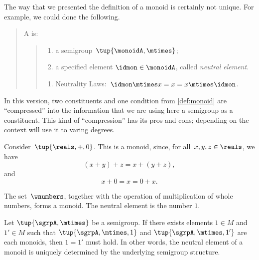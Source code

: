\begin{remark}
The way that we presented the definition of a monoid is certainly not unique. For example, we could done the following. 

\begin{quote}
  A \emph{} is: 
\begin{quote}
   \constit
   \begin{enumerate}
    \item a semigroup~$\tup{\monoidA, \mtimes}$;
    \item a specified element $\idmon\in \monoidA$, called \emph{neutral element}.
  \end{enumerate}
\condit
  \begin{enumerate}
    \item Neutrality Laws:~$\idmon\mtimes x=x=x\mtimes \idmon$.
  \end{enumerate}
  \end{quote}
\end{quote}
In this version, two constituents and one condition from \cref{def:monoid} are ``compressed'' into the information that we are using here a semigroup as a constituent. This kind of ``compression'' has its pros and cons; depending on the context will use it to varing degrees. 
\end{remark}




\begin{example}
  Consider~$\tup{\reals,+,0}$. This is a monoid, since, for all~$x,y, z \in \reals$, we have
  \begin{equation*}
  (x+y)
    +z=x+(y+z),
  \end{equation*}
  and
  \begin{equation*}
    x+0=x=0+x.
  \end{equation*}
\end{example}

\begin{example}
The set~$\wnumbers$, together with the operation of multiplication of whole numbers, forms a monoid. The neutral element is the number $1$. 
\end{example}

\begin{lemma}\label{neut-el-unique}
Let $\tup{\sgrpA, \mtimes}$ be a semigroup. If there exists elements $1 \in M$ and $1' \in M$ such that $\tup{\sgrpA, \mtimes, 1}$ and $\tup{\sgrpA, \mtimes, 1'}$ are each monoids, then $1 = 1'$ must hold. In other words, the neutral element of a monoid is uniquely determined by the underlying semigroup structure. 
\end{lemma}

